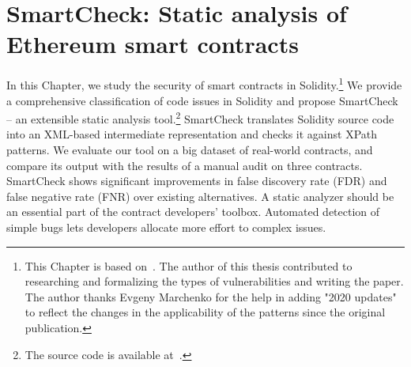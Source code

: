 \chapter{SmartCheck: Static analysis of Ethereum smart contracts}

\label{Chapter11SmartCheck}



In this Chapter, we study the security of smart contracts in Solidity.\footnote{This Chapter is based on~\cite{Tikhomirov2018}. The author of this thesis contributed to researching and formalizing the types of vulnerabilities and writing the paper. The author thanks Evgeny Marchenko for the help in adding "2020 updates" to reflect the changes in the applicability of the patterns since the original publication.}
We provide a comprehensive classification of code issues in Solidity and propose SmartCheck -- an extensible static analysis tool.\footnote{The source code is available at~\cite{SmartCheck}.}
SmartCheck translates Solidity source code into an XML-based intermediate representation and checks it against XPath patterns.
We evaluate our tool on a big dataset of real-world contracts, and compare its output with the results of a manual audit on three contracts.
SmartCheck shows significant improvements in false discovery rate (FDR) and false negative rate (FNR) over existing alternatives.
A static analyzer should be an essential part of the contract developers' toolbox.
Automated detection of simple bugs lets developers allocate more effort to complex issues.








